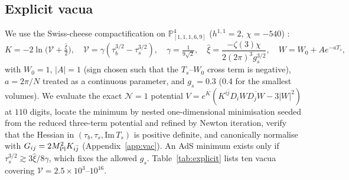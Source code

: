 \documentclass[11pt]{article}
\newcommand{\MP}{M_{\rm Pl}}
\begin{document}
\subsection{Explicit vacua}\label{sec:explicit}
We use the Swiss-cheese compactification on $\mathbb P^4_{[1,1,1,6,9]}$ ($h^{1,1}=2$, $\chi=-540$) \cite{Balasubramanian:2005zx}:
\begin{equation}
K=-2\ln\big(\mathcal V+\tfrac{\hat\xi}{2}\big),\quad\mathcal V=\gamma(\tau_b^{3/2}-\tau_s^{3/2}),\quad\gamma=\tfrac{1}{9\sqrt2},\quad\hat\xi=\frac{-\zeta(3)\chi}{2(2\pi)^3g_s^{3/2}},\quad W=W_0+Ae^{-aT_s},\label{eq:swiss}
\end{equation}
with $W_0=1$, $|A|=1$ (sign chosen such that the $T_s$--$W_0$ cross term is negative), $a=2\pi/N$ treated as a continuous parameter, and $g_s=0.3$ (0.4 for the smallest volumes). We evaluate the exact $\mathcal N=1$ potential $V=e^K(K^{i\bar j}D_iW\overline{D_jW}-3|W|^2)$ at $110$ digits, locate the minimum by nested one-dimensional minimisation seeded from the reduced three-term potential and refined by Newton iteration, verify that the Hessian in $(\tau_b,\tau_s,\mathrm{Im}\,T_s)$ is positive definite, and canonically normalise with $G_{ij}=2\MP^2K_{i\bar j}$ (Appendix~\ref{app:vac}). An AdS minimum exists only if $\tau_s^{3/2}\gtrsim3\hat\xi/8\gamma$, which fixes the allowed $g_s$. Table~\ref{tab:explicit} lists ten vacua covering $\mathcal V=2.5\times10^3$--$10^{16}$.
\end{document}
